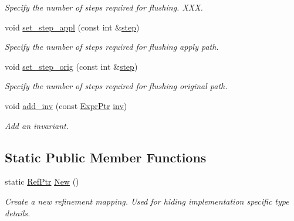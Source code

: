\begin{DoxyCompactItemize}
\begin{DoxyCompactList}\small\item\em Specify the number of steps required for flushing. X\+XX. \end{DoxyCompactList}\item 
\mbox{\label{classilang_1_1_refinement_map_a9addef636ea61a317a8da94584917cb7}} 
void \mbox{\hyperlink{classilang_1_1_refinement_map_a9addef636ea61a317a8da94584917cb7}{set\+\_\+step\+\_\+appl}} (const int \&\mbox{\hyperlink{classilang_1_1_refinement_map_a280d7ecd9328e202b203425e268c4635}{step}})
\begin{DoxyCompactList}\small\item\em Specify the number of steps required for flushing apply path. \end{DoxyCompactList}\item 
\mbox{\label{classilang_1_1_refinement_map_a11a3b3b60aaea9ceb07597cfc30d745f}} 
void \mbox{\hyperlink{classilang_1_1_refinement_map_a11a3b3b60aaea9ceb07597cfc30d745f}{set\+\_\+step\+\_\+orig}} (const int \&\mbox{\hyperlink{classilang_1_1_refinement_map_a280d7ecd9328e202b203425e268c4635}{step}})
\begin{DoxyCompactList}\small\item\em Specify the number of steps required for flushing original path. \end{DoxyCompactList}\item 
\mbox{\label{classilang_1_1_refinement_map_ac33bb0f1f64aa237a0e4f46b286714b7}} 
void \mbox{\hyperlink{classilang_1_1_refinement_map_ac33bb0f1f64aa237a0e4f46b286714b7}{add\+\_\+inv}} (const \mbox{\hyperlink{namespaceilang_a7c4196c72e53ea4df4b7861af7bc3bce}{Expr\+Ptr}} \mbox{\hyperlink{classilang_1_1_refinement_map_aca2583ef42b23c93b2574e7d2fb28a4e}{inv}})
\begin{DoxyCompactList}\small\item\em Add an invariant. \end{DoxyCompactList}\end{DoxyCompactItemize}
\subsection*{Static Public Member Functions}
\begin{DoxyCompactItemize}
\item 
\mbox{\label{classilang_1_1_refinement_map_a786f04262f0a6da48c594abe7ab2c84e}} 
static \mbox{\hyperlink{classilang_1_1_refinement_map_ab988c650cef076c777dd0200e8dab51f}{Ref\+Ptr}} \mbox{\hyperlink{classilang_1_1_refinement_map_a786f04262f0a6da48c594abe7ab2c84e}{New}} ()
\begin{DoxyCompactList}\small\item\em Create a new refinement mapping. Used for hiding implementation specific type details. \end{DoxyCompactList}\end{DoxyCompactItemize}


